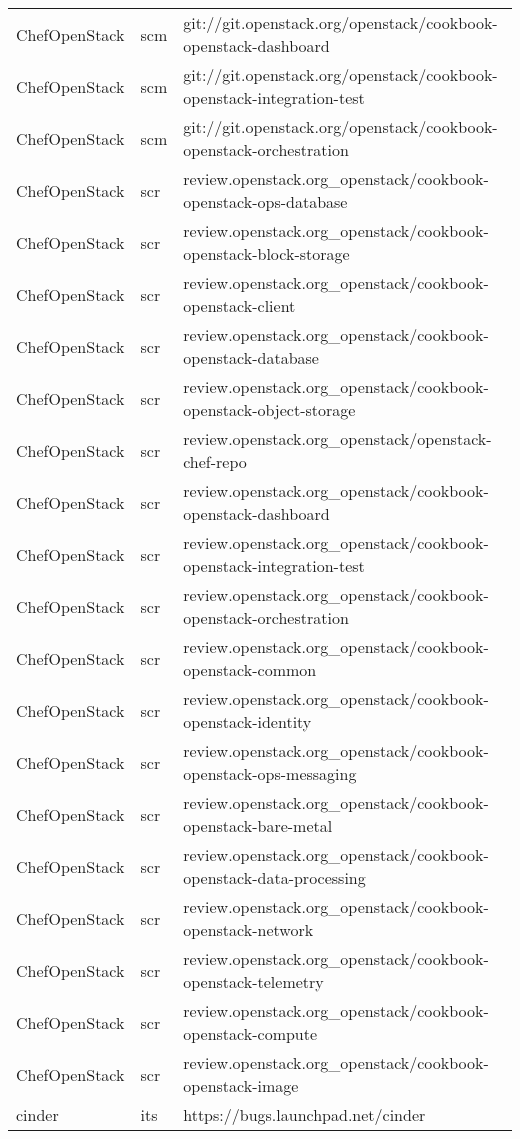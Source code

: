 \begin{center}
\begin{longtable}{|p{4cm}|p{1cm}|p{10cm}|}
ChefOpenStack&scm&git://git.openstack.org/openstack/cookbook-openstack-dashboard\\ 
ChefOpenStack&scm&git://git.openstack.org/openstack/cookbook-openstack-integration-test\\ 
ChefOpenStack&scm&git://git.openstack.org/openstack/cookbook-openstack-orchestration\\ 
ChefOpenStack&scr&review.openstack.org\_openstack/cookbook-openstack-ops-database\\ 
ChefOpenStack&scr&review.openstack.org\_openstack/cookbook-openstack-block-storage\\ 
ChefOpenStack&scr&review.openstack.org\_openstack/cookbook-openstack-client\\ 
ChefOpenStack&scr&review.openstack.org\_openstack/cookbook-openstack-database\\ 
ChefOpenStack&scr&review.openstack.org\_openstack/cookbook-openstack-object-storage\\ 
ChefOpenStack&scr&review.openstack.org\_openstack/openstack-chef-repo\\ 
ChefOpenStack&scr&review.openstack.org\_openstack/cookbook-openstack-dashboard\\ 
ChefOpenStack&scr&review.openstack.org\_openstack/cookbook-openstack-integration-test\\ 
ChefOpenStack&scr&review.openstack.org\_openstack/cookbook-openstack-orchestration\\ 
ChefOpenStack&scr&review.openstack.org\_openstack/cookbook-openstack-common\\ 
ChefOpenStack&scr&review.openstack.org\_openstack/cookbook-openstack-identity\\ 
ChefOpenStack&scr&review.openstack.org\_openstack/cookbook-openstack-ops-messaging\\ 
ChefOpenStack&scr&review.openstack.org\_openstack/cookbook-openstack-bare-metal\\ 
ChefOpenStack&scr&review.openstack.org\_openstack/cookbook-openstack-data-processing\\ 
ChefOpenStack&scr&review.openstack.org\_openstack/cookbook-openstack-network\\ 
ChefOpenStack&scr&review.openstack.org\_openstack/cookbook-openstack-telemetry\\ 
ChefOpenStack&scr&review.openstack.org\_openstack/cookbook-openstack-compute\\ 
ChefOpenStack&scr&review.openstack.org\_openstack/cookbook-openstack-image\\ 
cinder&its&https://bugs.launchpad.net/cinder\\ 

\end{longtable}
\end{center}

